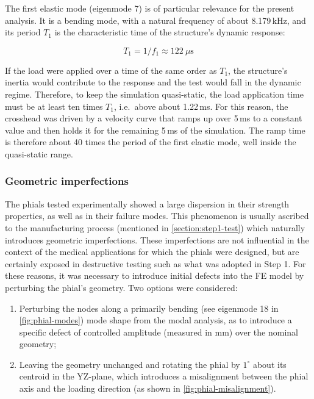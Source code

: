The first elastic mode (eigenmode 7) is of particular relevance for the present analysis. It is a bending mode, with a natural frequency of about 8.179\,kHz, and its period $T_1$ is the characteristic time of the structure's dynamic response:

\begin{equation}
T_1 = 1/f_1 \approx 122~\mu\mathrm{s}
\end{equation}

If the load were applied over a time of the same order as $T_1$, the structure's inertia would contribute to the response and the test would fall in the dynamic regime. Therefore, to keep the simulation quasi-static, the load application time must be at least ten times $T_1$, i.e.\ above about 1.22\,ms. For this reason, the crosshead was driven by a velocity curve that ramps up over 5\,ms to a constant value and then holds it for the remaining 5\,ms of the simulation. The ramp time is therefore about 40 times the period of the first elastic mode, well inside the quasi-static range. 

\subsubsection{Geometric imperfections}
The phials tested experimentally showed a large dispersion in their strength properties, as well as in their failure modes. This phenomenon is usually ascribed to the manufacturing process (mentioned in \cref{section:step1-test}) which naturally introduces geometric imperfections. These imperfections are not influential in the context of the medical applications for which the phials were designed, but are certainly exposed in destructive testing such as what was adopted in Step 1. For these reasons, it was necessary to introduce initial defects into the FE model by perturbing the phial's geometry. Two options were considered:
\begin{enumerate}
  \item Perturbing the nodes along a primarily bending (see eigenmode 18 in \cref{fig:phial-modes}) mode shape from the modal analysis, as to introduce a specific defect of controlled amplitude (measured in mm) over the nominal geometry;
  \item Leaving the geometry unchanged and rotating the phial by $1^\circ$ about its centroid in the YZ-plane, which introduces a misalignment between the phial axis and the loading direction (as shown in \cref{fig:phial-misalignment}).
\end{enumerate}

